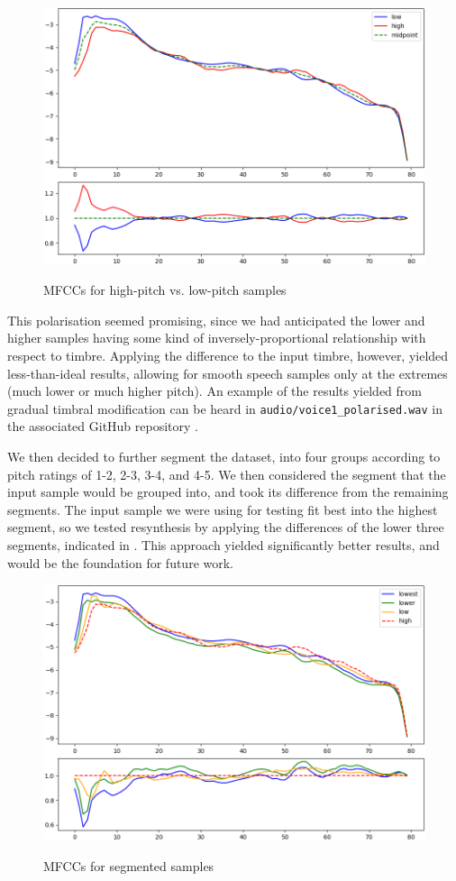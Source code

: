\documentclass{article}
\begin{document}
\begin{figure}
  \centering
  \includegraphics[alt={Compared mel-cepstra of samples rated low vs. high in pitch},width=0.9\linewidth]{highlow.png}
  \caption{MFCCs for high-pitch vs. low-pitch samples}
  \label{fig:highlow}
\end{figure}

This polarisation seemed promising, since we had anticipated the lower and higher samples having some kind of inversely-proportional relationship with respect to timbre. Applying the difference to the input timbre, however, yielded less-than-ideal results, allowing for smooth speech samples only at the extremes (much lower or much higher pitch). An example of the results yielded from gradual timbral modification can be heard in \texttt{audio/voice1\_polarised.wav} in the associated GitHub repository \cite{github}.

We then decided to further segment the dataset, into four groups according to pitch ratings of 1-2, 2-3, 3-4, and 4-5. We then considered the segment that the input sample would be grouped into, and took its difference from the remaining segments. The input sample we were using for testing fit best into the highest segment, so we tested resynthesis by applying the differences of the lower three segments, indicated in . This approach yielded significantly better results, and would be the foundation for future work.

\begin{figure}
  \centering
  \includegraphics[alt={Compared mel-cepstra of segmented samples},width=0.9\linewidth]{segments.png}
  \caption{MFCCs for segmented samples}
  \label{fig:segments}
\end{figure}
\end{document}

